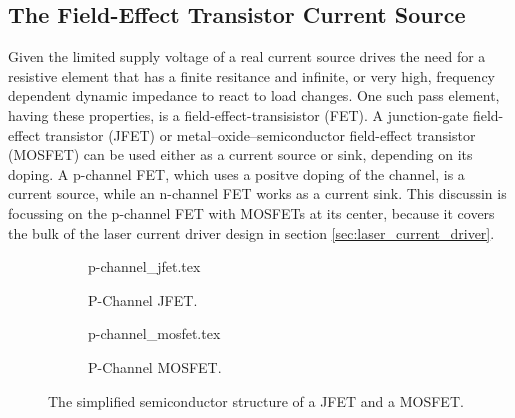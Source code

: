 \subsection{The Field-Effect Transistor Current Source}
\label{sec:mosfet_current_source}
Given the limited supply voltage of a real current source drives the need for a resistive element that has a finite resitance and infinite, or very high, frequency dependent dynamic impedance to react to load changes. One such pass element, having these properties, is a field-effect-transisistor (FET). A junction-gate field-effect transistor (JFET) or metal–oxide–semiconductor field-effect transistor (MOSFET) can be used either as a current source or sink, depending on its doping. A p-channel FET, which uses a positve doping of the channel, is a current source, while an n-channel FET works as a current sink. This discussin is focussing on the p-channel FET with MOSFETs at its center, because it covers the bulk of the laser current driver design in section \ref{sec:laser_current_driver}.

\begin{figure}[hb]
    \centering
    \begin{subfigure}{0.4\linewidth}
        \centering
        {p-channel_jfet.tex}
        \caption{P-Channel JFET.}
        \label{fig:pjfet}
    \end{subfigure}
    \begin{subfigure}{0.4\linewidth}
        \centering
        {p-channel_mosfet.tex}
        \caption{P-Channel MOSFET.}
        \label{fig:pmos}
    \end{subfigure}
    \caption{The simplified semiconductor structure of a JFET and a MOSFET.}
    \label{fig:FETs}
\end{figure}

